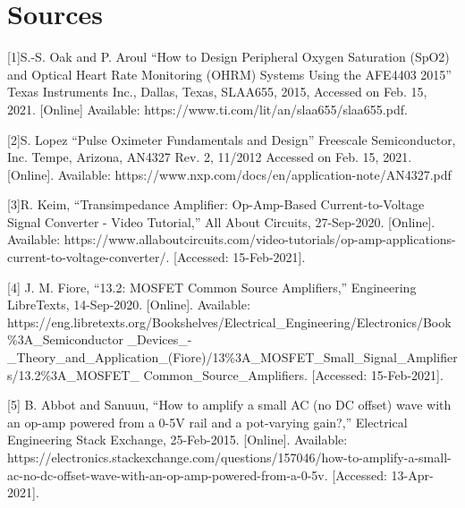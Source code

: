 \documentclass{article}
\begin{document}
\section{Sources}
    [1]S.-S. Oak and P. Aroul “How to Design Peripheral Oxygen Saturation (SpO2) and Optical Heart Rate Monitoring (OHRM) Systems Using the AFE4403 2015” Texas Instruments Inc., Dallas, Texas, SLAA655, 2015, Accessed on Feb. 15, 2021. [Online] Available: https://www.ti.com/lit/an/slaa655/slaa655.pdf.
    
    [2]S. Lopez “Pulse Oximeter Fundamentals and Design” Freescale Semiconductor, Inc. Tempe, Arizona, AN4327 Rev. 2, 11/2012 Accessed on Feb. 15, 2021. [Online]. Available: https://www.nxp.com/docs/en/application-note/AN4327.pdf
    
    [3]R. Keim, “Transimpedance Amplifier: Op-Amp-Based Current-to-Voltage Signal Converter - Video Tutorial,” All About Circuits, 27-Sep-2020. [Online]. Available: https://www.allaboutcircuits.com/video-tutorials/op-amp-applications-current-to-voltage-converter/. [Accessed: 15-Feb-2021]. 
    
    [4] J. M. Fiore, “13.2: MOSFET Common Source Amplifiers,” Engineering LibreTexts, 14-Sep-2020. [Online]. Available: https://eng.libretexts.org/Bookshelves/Electrical\_Engineering/Electronics/Book\%3A\_Semiconductor
    \_Devices\_-\_Theory\_and\_Application\_(Fiore)/13\%3A\_MOSFET\_Small\_Signal\_Amplifiers/13.2\%3A\_MOSFET\_
    Common\_Source\_Amplifiers. [Accessed: 15-Feb-2021]. 

    [5] B. Abbot and Sanuuu, “How to amplify a small AC (no DC offset) wave with an op-amp powered from a 0-5V rail and a pot-varying gain?,” Electrical Engineering Stack Exchange, 25-Feb-2015. [Online]. Available: https://electronics.stackexchange.com/questions/157046/how-to-amplify-a-small-ac-no-dc-offset-wave-with-an-op-amp-powered-from-a-0-5v. [Accessed: 13-Apr-2021]. 
\end{document}
